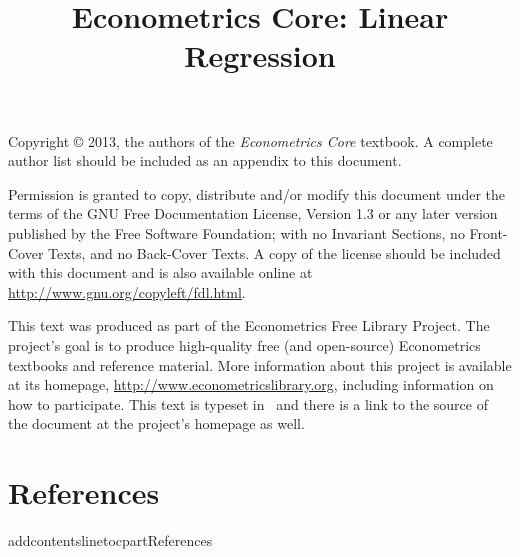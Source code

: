 \documentclass{tex/tufte-handout}
\title{Econometrics Core: Linear Regression}
\begin{document}
\maketitle

\bigskip\noindent%
Copyright © 2013, the authors of the \textit{Econometrics Core}
textbook.  A complete author list should be included as an appendix to
this document.

Permission is granted to copy, distribute and/or modify this document
under the terms of the GNU Free Documentation License, Version 1.3 or
any later version published by the Free Software Foundation; with no
Invariant Sections, no Front-Cover Texts, and no Back-Cover Texts.  A
copy of the license should be included with this document and is also
available online at \url{http://www.gnu.org/copyleft/fdl.html}.

This text was produced as part of the Econometrics Free Library
Project.  The project's goal is to produce high-quality free (and
open-source) Econometrics textbooks and reference material.  More
information about this project is available at its homepage,
\url{http://www.econometricslibrary.org}, including information on how
to participate.  This text is typeset in \XeLaTeX\ and there is a link
to the source of the document at the project's homepage as well.

\tableofcontents
\newpage
{}
\setcounter{page}{1}








\part*{References}%
addcontentsline{toc}{part}{References}

\end{document}
